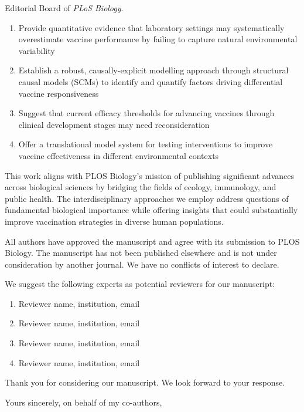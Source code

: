 \documentclass[11pt, a4paper]{letter} %
\begin{document}
\begin{letter}{
    Editorial Board of \emph{PLoS Biology}.
}
\begin{enumerate}
\item Provide quantitative evidence that laboratory settings may systematically overestimate vaccine performance by failing to capture natural environmental variability
\item Establish a robust, causally-explicit modelling approach through structural causal models (SCMs) to identify and quantify factors driving differential vaccine responsiveness
\item Suggest that current efficacy thresholds for advancing vaccines through clinical development stages may need reconsideration
\item Offer a translational model system for testing interventions to improve vaccine effectiveness in different environmental contexts
\end{enumerate}

This work aligns with PLOS Biology's mission of publishing significant advances across biological sciences by bridging the fields of ecology, immunology, and public health. The interdisciplinary approaches we employ address questions of fundamental biological importance while offering insights that could substantially improve vaccination strategies in diverse human populations.

All authors have approved the manuscript and agree with its submission to PLOS Biology. The manuscript has not been published elsewhere and is not under consideration by another journal. We have no conflicts of interest to declare.

We suggest the following experts as potential reviewers for our manuscript:

\begin{enumerate}
\item Reviewer name, institution, email
\item Reviewer name, institution, email
\item Reviewer name, institution, email
\item Reviewer name, institution, email
\end{enumerate}

Thank you for considering our manuscript. We look forward to your response.

\closing{Yours sincerely, on behalf of my co-authors,}


\def\thefootnote{}
\def\footnoterule{\hrule}
\def\thefootnote{\arabic{footnote}}


\end{letter}
\end{document}
